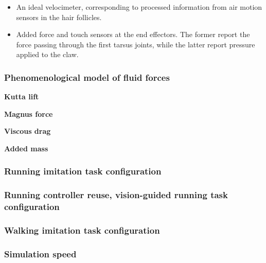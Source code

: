 \documentclass[sn-mathphys-num]{sn-jnl}%
\theoremstyle{thmstyleone}%
\theoremstyle{thmstyletwo}%
\theoremstyle{thmstylethree}%
\begin{document}
\begin{appendices}
\begin{itemize}
\begin{itemize}
			\item 
			An ideal velocimeter, corresponding to processed information from air motion sensors in the hair follicles.
			
			\item Added force and touch sensors at the end effectors. The former report the force passing through the first tarsus joints, while the latter report pressure applied to the claw.
		\end{itemize}
\end{itemize}



\subsubsection{Phenomenological model of fluid forces}


\textbf{Kutta lift}

\textbf{Magnus force}


\textbf{Viscous drag}


\textbf{Added mass}


\subsubsection{Running imitation task configuration}

\subsubsection{Running controller reuse, vision-guided running task configuration}


\subsubsection{Walking imitation task configuration}


\subsubsection{Simulation speed}






\end{appendices}
\end{document}
